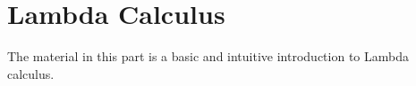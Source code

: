 \documentclass[../../include/open-logic-part]{subfiles}
\begin{document}
\part{Lambda Calculus}

\begin{editorial}
  The material in this part is a basic and intuitive introduction to
  Lambda calculus.
\end{editorial}


\OLEndPartHook
\end{document}
